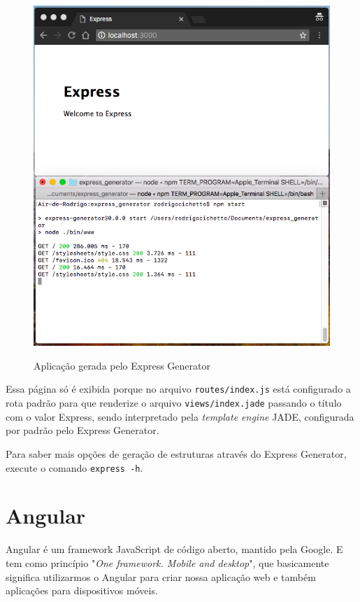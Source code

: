 \documentclass[
	12pt,				%
	openright,			%
	twoside,			%
	a4paper,			%
	english,			%
	brazil				%
	]{abntex2}
\begin{document}
\begin{figure}[h]
	\centering

	\caption{Aplicação gerada pelo Express Generator} \label{fig:ExpressGeneratorApp}
    \includegraphics[scale=0.5]{express-generator-app} \\

\end{figure}

Essa página só é exibida porque no arquivo \verb|routes/index.js| está configurado a rota padrão para que renderize o arquivo \verb|views/index.jade| passando o título com o valor Express, sendo interpretado pela \textit{template engine} JADE, configurada por padrão pelo Express Generator.

Para saber mais opções de geração de estruturas através do Express Generator, execute o comando \verb|express -h|.

\section{Angular}

Angular é um framework JavaScript de código aberto, mantido pela Google. E tem como princípio "\textit{One framework. Mobile and desktop}", que basicamente significa utilizarmos o Angular para criar nossa aplicação web e também aplicações para dispositivos móveis.
\end{document}

